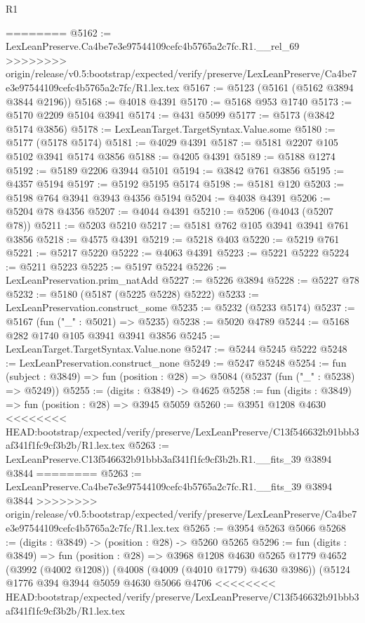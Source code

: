 \begin{lexlean}{R1}
\begin{coremodule}
{{{{{{{{{{{{{{{{{{{{{{{{{{{{{{{{{{{{{{{{{{{{{{{{{{{{{{{{{{{{{{{{{{{{{{{{{{{{{{{{{{{{{{{{{{{{{{{{{{{{{{{{{{{{{{{{{{{{{{{{{{{{{{{{{{{{{{{{{{{{{{{{{{{{{{{{{{{{{{{{{{{{{{{{{{{{{{{{{{{{{{{{{{========
@5162 := LexLeanPreserve.Ca4be7e3e97544109cefc4b5765a2c7fc.R1.__rel_69
>>>>>>>> origin/release/v0.5:bootstrap/expected/verify/preserve/LexLeanPreserve/Ca4be7e3e97544109cefc4b5765a2c7fc/R1.lex.tex
@5167 := @5123 (@5161 (@5162 @3894 @3844 @2196))
@5168 := @4018 @4391
@5170 := @5168 @953 @1740
@5173 := @5170 @2209 @5104 @3941
@5174 := @431 @5099
@5177 := @5173 (@3842 @5174 @3856)
@5178 := LexLeanTarget.TargetSyntax.Value.some
@5180 := @5177 (@5178 @5174)
@5181 := @4029 @4391
@5187 := @5181 @2207 @105 @5102 @3941 @5174 @3856
@5188 := @4205 @4391
@5189 := @5188 @1274
@5192 := @5189 @2206 @3944 @5101
@5194 := @3842 @761 @3856
@5195 := @4357 @5194
@5197 := @5192 @5195 @5174
@5198 := @5181 @120
@5203 := @5198 @764 @3941 @3943 @4356 @5194
@5204 := @4038 @4391
@5206 := @5204 @78 @4356
@5207 := @4044 @4391
@5210 := @5206 (@4043 (@5207 @78))
@5211 := @5203 @5210
@5217 := @5181 @762 @105 @3941 @3941 @761 @3856
@5218 := @4575 @4391
@5219 := @5218 @403
@5220 := @5219 @761
@5221 := @5217 @5220
@5222 := @4063 @4391
@5223 := @5221 @5222
@5224 := @5211 @5223
@5225 := @5197 @5224
@5226 := LexLeanPreservation.prim_natAdd
@5227 := @5226 @3894
@5228 := @5227 @78
@5232 := @5180 (@5187 (@5225 @5228) @5222)
@5233 := LexLeanPreservation.construct_some
@5235 := @5232 (@5233 @5174)
@5237 := @5167 (fun ("_" : @5021) => @5235)
@5238 := @5020 @4789
@5244 := @5168 @282 @1740 @105 @3941 @3941 @3856
@5245 := LexLeanTarget.TargetSyntax.Value.none
@5247 := @5244 @5245 @5222
@5248 := LexLeanPreservation.construct_none
@5249 := @5247 @5248
@5254 := fun (subject : @3849) => fun (position : @28) => @5084 (@5237 (fun ("_" : @5238) => @5249))
@5255 := (digits : @3849) -> @4625
@5258 := fun (digits : @3849) => fun (position : @28) => @3945 @5059
@5260 := @3951 @1208 @4630
<<<<<<<< HEAD:bootstrap/expected/verify/preserve/LexLeanPreserve/C13f546632b91bbb3af341f1fc9cf3b2b/R1.lex.tex
@5263 := LexLeanPreserve.C13f546632b91bbb3af341f1fc9cf3b2b.R1.__fits_39 @3894 @3844
========
@5263 := LexLeanPreserve.Ca4be7e3e97544109cefc4b5765a2c7fc.R1.__fits_39 @3894 @3844
>>>>>>>> origin/release/v0.5:bootstrap/expected/verify/preserve/LexLeanPreserve/Ca4be7e3e97544109cefc4b5765a2c7fc/R1.lex.tex
@5265 := @3954 @5263 @5066
@5268 := (digits : @3849) -> (position : @28) -> @5260 @5265
@5296 := fun (digits : @3849) =>
  fun (position : @28) =>
  @3968
    @1208
    @4630
    @5265
    @1779
    @4652
    (@3992 (@4002 @1208))
    (@4008 (@4009 (@4010 @1779) @4630 @3986))
    (@5124
      @1776
      @394
      @3944
      @5059
      @4630
      @5066
      @4706
<<<<<<<< HEAD:bootstrap/expected/verify/preserve/LexLeanPreserve/C13f546632b91bbb3af341f1fc9cf3b2b/R1.lex.tex
}}}}}}}}}}}}}}}}}}}}}}}}}}}}}}}}}}}}}}}}}}}}}}}}}}}}}}}}}}}}}}}}}}}}}}}}}}}}}}}}}}}}}}}}}}}}}}}}}}}}}}}}}}}}}}}}}}}}}}}}}}}}}}}}}}}}}}}}}}}}}}}}}}}}}}}}}}}}}}}}}}}}}}}}}}}}}}}}}}}}}}}}}}
\end{coremodule}
\end{lexlean}
